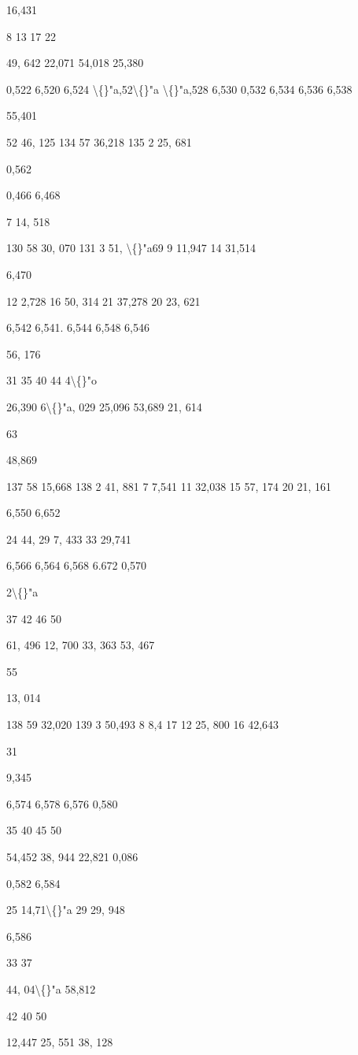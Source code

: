 \documentclass[10pt,a4paper]{article}
\begin{document}
16,431

8
13
17
22

49, 642
22,071
54,018
25,380

0,522
6,520
6,524
\textbackslash\{\}"a,52\textbackslash\{\}"a
\textbackslash\{\}"a,528
6,530
0,532
6,534
6,536
6,538

55,401

52 46, 125
134 57 36,218
135 2 25, 681

0,562

0,466
6,468

7 14, 518

130 58 30, 070
131 3 51, \textbackslash\{\}"a69
9 11,947
14 31,514

6,470

12 2,728
16 50, 314
21 37,278
20 23, 621

6,542
6,541.
6,544
6,548
6,546

56, 176

31
35
40
44
4\textbackslash\{\}"o

26,390
6\textbackslash\{\}"a, 029
25,096
53,689
21, 614

63

48,869

137 58 15,668
138 2 41, 881
7 7,541
11 32,038
15 57, 174
20 21, 161

6,550
6,652

24 44,
29
7, 433
33 29,741

6,566
6,564
6,568
6.672
0,570

2\textbackslash\{\}"a

37
42
46
50

61, 496
12, 700
33, 363
53, 467

55

13, 014

138 59 32,020
139 3 50,493
8 8,4 17
12 25, 800
16 42,643

31

9,345

6,574
6,578
6,576
0,580

35
40
45
50

54,452
38, 944
22,821
0,086

0,582
6,584

25 14,71\textbackslash\{\}"a
29 29, 948

6,586

33
37

44, 04\textbackslash\{\}"a
58,812

42
40
50

12,447
25, 551
38, 128
\end{document}
